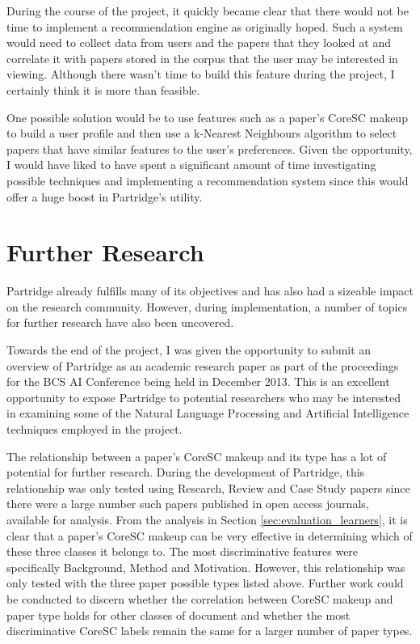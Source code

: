 During the course of the project, it quickly became clear that there would
not be time to implement a recommendation engine as originally hoped. Such a
system would need to collect data from users and the papers that they looked at
and correlate it with papers stored in the corpus that the user may be
interested in viewing. Although there wasn't time to build this feature during
the project, I certainly think it is more than feasible. 

One possible solution would be to use features such as a paper's CoreSC makeup
to build a user profile and then use a k-Nearest Neighbours algorithm to select
papers that have similar features to the user's preferences. Given the
opportunity, I would have liked to have spent a significant amount of time
investigating possible techniques and implementing a recommendation system
since this would offer a huge boost in Partridge's utility.

\section{ Further Research }

Partridge already fulfills many of its objectives and has also had a sizeable
impact on the research community. However,  during implementation, a number of
topics for further research have also been uncovered.

Towards the end of the project, I was given the opportunity to submit an
overview of Partridge as an academic research paper as part of the proceedings
for the BCS AI Conference being held in December 2013. This is an excellent
opportunity to expose Partridge to potential researchers who may be interested
in examining some of the Natural Language Processing and Artificial
Intelligence techniques employed in the project.

The relationship between a paper's  CoreSC makeup and its type has a lot of
potential for further research. During the development of Partridge, this
relationship was only tested using Research, Review and Case Study papers since
there were a large number such papers published in open access journals,
available for analysis. From the analysis in Section
\ref{sec:evaluation_learners}, it is clear that a paper's CoreSC makeup can be
very effective in determining which of these three classes it belongs to. The
most discriminative features were specifically Background, Method and
Motivation. However, this relationship was only tested with the three paper
possible types listed above. Further work could be conducted to discern whether
the correlation between CoreSC makeup and paper type holds for other classes of
document and whether the most discriminative CoreSC labels remain the same for
a larger number of paper types.

